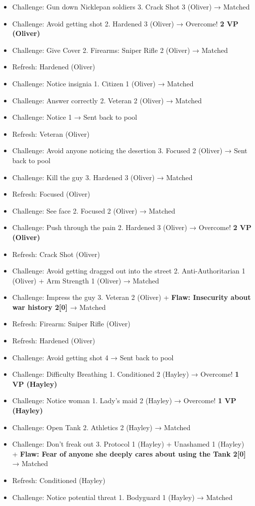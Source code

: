 \begin{itemize}
\item Challenge: Gun down Nicklepan soldiers 3.  Crack Shot 3 (Oliver) → Matched
\item Challenge: Avoid getting shot 2.  Hardened 3 (Oliver) → Overcome! \textbf{2 VP (Oliver)}
\item Challenge: Give Cover 2.  Firearms: Sniper Rifle 2 (Oliver) → Matched
\item Refresh: Hardened (Oliver)
\item Challenge: Notice insignia 1. Citizen 1 (Oliver)  → Matched
\item Challenge: Answer correctly 2. Veteran 2 (Oliver)  → Matched
\item Challenge: Notice 1 → Sent back to pool
\item Refresh: Veteran (Oliver)
\item Challenge: Avoid anyone noticing the desertion 3.  Focused 2 (Oliver) → Sent back to pool
\item Challenge: Kill the guy 3. Hardened 3 (Oliver) → Matched
\item Refresh: Focused (Oliver)
\item Challenge: See face 2.  Focused 2 (Oliver) → Matched
\item Challenge: Push through the pain 2.  Hardened 3 (Oliver) → Overcome! \textbf{2 VP (Oliver)}
\item Refresh: Crack Shot (Oliver)
\item Challenge: Avoid getting dragged out into the street 2. Anti-Authoritarian 1 (Oliver) + Arm Strength 1 (Oliver) → Matched
\item Challenge: Impress the guy 3. Veteran 2 (Oliver) + \textbf{ {\color[RGB]{255,0,0}Flaw: Insecurity about war history 2{[}0{]} } } → Matched
\item Refresh: Firearm: Sniper Rifle (Oliver)
\item Refresh: Hardened (Oliver)
\item Challenge: Avoid getting shot 4 → Sent back to pool
\item Challenge: Difficulty Breathing 1.  Conditioned 2 (Hayley) → Overcome! \textbf{1 VP (Hayley)}
\item Challenge: Notice woman 1.  Lady's maid 2 (Hayley) → Overcome! \textbf{1 VP (Hayley)}
\item Challenge: Open Tank 2.  Athletics 2 (Hayley) → Matched 
\item Challenge: Don't freak out 3.  Protocol 1 (Hayley) + Unashamed 1 (Hayley) + \textbf{ {\color[RGB]{255,0,0}Flaw: Fear of anyone she deeply cares about using the Tank 2{[}0{]}} } → Matched 
\item Refresh: Conditioned (Hayley)
\item Challenge: Notice potential threat 1.  Bodyguard 1 (Hayley) → Matched 
\end{itemize}

